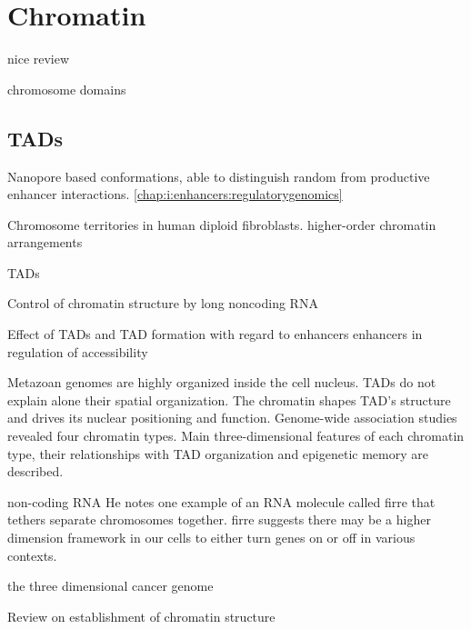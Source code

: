 \chapter{Chromatin}
\minitoc


nice review \cite{Gibcus2013}

chromosome domains \cite{Sexton2015}

\section{TADs}
\label{chap:i:chromatin:tads}

Nanopore based conformations, able to distinguish random from productive enhancer interactions\cite{Allahyar2018}.
\ref{chap:i:enhancers:regulatorygenomics}

Chromosome territories \cite{Bolzer2005} in human diploid fibroblasts. higher-order chromatin arrangements 

TADs\cite{Dixon2012,Hou2012,Nora2012,Sexton2012}


Control of chromatin structure by long noncoding RNA \cite{Boehmdorfer2015}

\cite{Branco2006}

Effect of TADs and TAD formation with regard to enhancers \cite{Long2016}
enhancers in regulation of accessibility \cite{Sleckman1996}

Metazoan genomes are highly organized inside the cell nucleus.
TADs do not explain alone their spatial organization.
The chromatin shapes TAD's structure and drives its nuclear positioning and function.
Genome-wide association studies revealed four chromatin types.
Main three-dimensional features of each chromatin type, their relationships with TAD organization and epigenetic memory are described.


non-coding RNA
He notes one example of an RNA molecule called firre that tethers separate chromosomes together. firre suggests there may be a higher dimension framework in our cells to either turn genes on or off in various contexts. 



the three dimensional cancer genome\cite{Corces2016a}

Review on establishment of chromatin structure\cite{Hug2018}